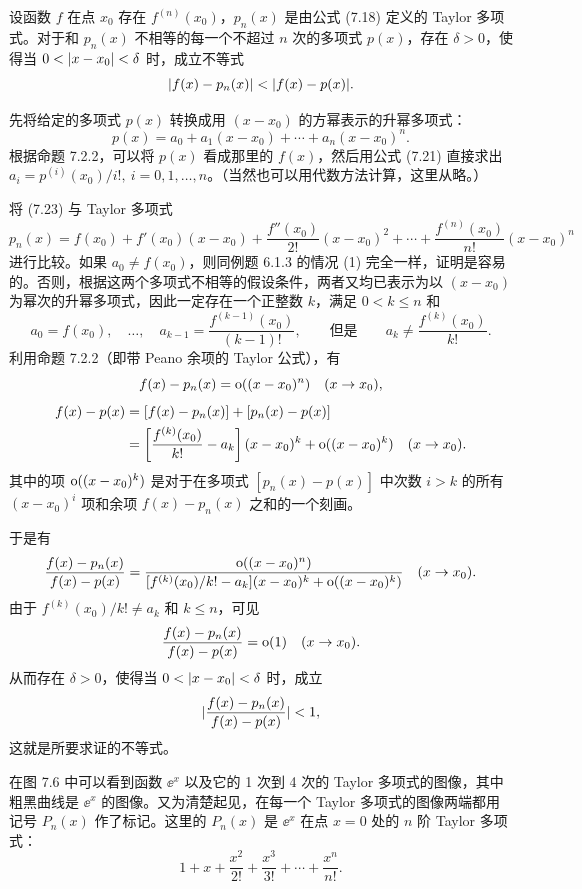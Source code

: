 \begin{xproposition}
设函数 $f$ 在点 $x_0$ 存在 $f^{(n)}(x_0)$，$p_n(x)$ 是由公式 (7.18) 定义的 Taylor 多项式。对于和 $p_n(x)$ 不相等的每一个不超过 $n$ 次的多项式 $p(x)$，存在 $\delta>0$，使得当 $0<\lvert x-x_0\rvert<\delta$ 时，成立不等式
\[
  \lvert f(x)-p_n(x)\rvert<\lvert f(x)-p(x)\rvert.
\]
\end{xproposition}
\begin{xproof}
先将给定的多项式 $p(x)$ 转换成用 $(x-x_0)$ 的方幂表示的升幂多项式：
\begin{equation}
  p(x)=a_0+a_1(x-x_0)+\cdots+a_n(x-x_0)^n.
  \tag{7.23}
\end{equation}
根据命题 7.2.2，可以将 $p(x)$ 看成那里的 $f(x)$，然后用公式 (7.21) 直接求出 $a_i=p^{(i)}(x_0)/i!,\ i=0,1,\ldots,n$。（当然也可以用代数方法计算，这里从略。）

将 (7.23) 与 Taylor 多项式
\[
  p_n(x)=f(x_0)+f'(x_0)(x-x_0)+\frac{f''(x_0)}{2!}(x-x_0)^2+\cdots+\frac{f^{(n)}(x_0)}{n!}(x-x_0)^n
\]
进行比较。如果 $a_0\neq f(x_0)$，则同例题 6.1.3 的情况 (1) 完全一样，证明是容易的。否则，根据这两个多项式不相等的假设条件，两者又均已表示为以 $(x-x_0)$ 为幂次的升幂多项式，因此一定存在一个正整数 $k$，满足 $0<k\leqslant n$ 和
\[
  a_0=f(x_0),\quad\ldots,\quad a_{k-1}=\frac{f^{(k-1)}(x_0)}{(k-1)!},
  \qquad\text{但是}\qquad
  a_k\neq\frac{f^{(k)}(x_0)}{k!}.
\]
利用命题 7.2.2（即带 Peano 余项的 Taylor 公式），有
\[
  f(x)-p_n(x)=\mathrm{o}((x-x_0)^n)\quad(x\to x_0),
\]
\[
  \begin{aligned}
  f(x)-p(x)
  &=[f(x)-p_n(x)]+[p_n(x)-p(x)]\\
  &=\left[\frac{f^{(k)}(x_0)}{k!}-a_k\right](x-x_0)^k+\mathrm{o}((x-x_0)^k)\quad(x\to x_0).
  \end{aligned}
\]
其中的项 $\mathrm{o}((x-x_0)^k)$ 是对于在多项式 $[p_n(x)-p(x)]$ 中次数 $i>k$ 的所有 $(x-x_0)^i$ 项和余项 $f(x)-p_n(x)$ 之和的一个刻画。

于是有
\[
  \frac{f(x)-p_n(x)}{f(x)-p(x)}
  =\frac{\mathrm{o}((x-x_0)^n)}{[f^{(k)}(x_0)/k!-a_k](x-x_0)^k+\mathrm{o}((x-x_0)^k)}\quad(x\to x_0).
\]
由于 $f^{(k)}(x_0)/k!\neq a_k$ 和 $k\leqslant n$，可见
\[
  \frac{f(x)-p_n(x)}{f(x)-p(x)}=\mathrm{o}(1)\quad(x\to x_0).
\]
从而存在 $\delta>0$，使得当 $0<\lvert x-x_0\rvert<\delta$ 时，成立
\[
  \lvert\frac{f(x)-p_n(x)}{f(x)-p(x)}\rvert<1,
\]
这就是所要求证的不等式。
\end{xproof}

在图 7.6 中可以看到函数 $\ee^x$ 以及它的 1 次到 4 次的 Taylor 多项式的图像，其中粗黑曲线是 $\ee^x$ 的图像。又为清楚起见，在每一个 Taylor 多项式的图像两端都用记号 $P_n(x)$ 作了标记。这里的 $P_n(x)$ 是 $\ee^x$ 在点 $x=0$ 处的 $n$ 阶 Taylor 多项式：
\[
  1+x+\frac{x^2}{2!}+\frac{x^3}{3!}+\cdots+\frac{x^n}{n!}.
\]

